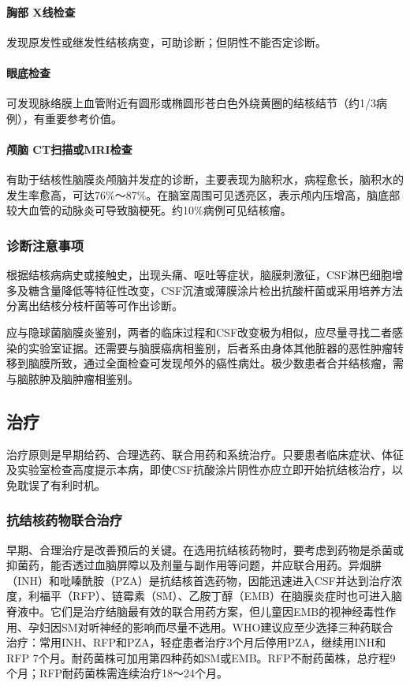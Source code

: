 \paragraph{胸部 X线检查}

发现原发性或继发性结核病变，可助诊断；但阴性不能否定诊断。

\paragraph{眼底检查}

可发现脉络膜上血管附近有圆形或椭圆形苍白色外绕黄圈的结核结节（约1/3病例），有重要参考价值。

\paragraph{颅脑 CT扫描或MRI检查}

有助于结核性脑膜炎颅脑并发症的诊断，主要表现为脑积水，病程愈长，脑积水的发生率愈高，可达76\%～87\%。在脑室周围可见透亮区，表示颅内压增高，脑底部较大血管的动脉炎可导致脑梗死。约10\%病例可见结核瘤。

\subsubsection{诊断注意事项}

根据结核病病史或接触史，出现头痛、呕吐等症状，脑膜刺激征，CSF淋巴细胞增多及糖含量降低等特征性改变，CSF沉渣或薄膜涂片检出抗酸杆菌或采用培养方法分离出结核分枝杆菌等可作出诊断。

应与隐球菌脑膜炎鉴别，两者的临床过程和CSF改变极为相似，应尽量寻找二者感染的实验室证据。还需要与脑膜癌病相鉴别，后者系由身体其他脏器的恶性肿瘤转移到脑膜所致，通过全面检查可发现颅外的癌性病灶。极少数患者合并结核瘤，需与脑脓肿及脑肿瘤相鉴别。

\subsection{治疗}

治疗原则是早期给药、合理选药、联合用药和系统治疗。只要患者临床症状、体征及实验室检查高度提示本病，即使CSF抗酸涂片阴性亦应立即开始抗结核治疗，以免耽误了有利时机。

\subsubsection{抗结核药物联合治疗}

早期、合理治疗是改善预后的关键。在选用抗结核药物时，要考虑到药物是杀菌或抑菌药，能否透过血脑屏障以及剂量与副作用等问题，并应联合用药。异烟肼（INH）和吡嗪酰胺（PZA）是抗结核首选药物，因能迅速进入CSF并达到治疗浓度，利福平（RFP）、链霉素（SM）、乙胺丁醇（EMB）在脑膜炎症时也可进入脑脊液中。它们是治疗结脑最有效的联合用药方案，但儿童因EMB的视神经毒性作用、孕妇因SM对听神经的影响而尽量不选用。WHO建议应至少选择三种药联合治疗：常用INH、RFP和PZA，轻症患者治疗3个月后停用PZA，继续用INH和RFP
7个月。耐药菌株可加用第四种药如SM或EMB。RFP不耐药菌株，总疗程9个月；RFP耐药菌株需连续治疗18～24个月。

